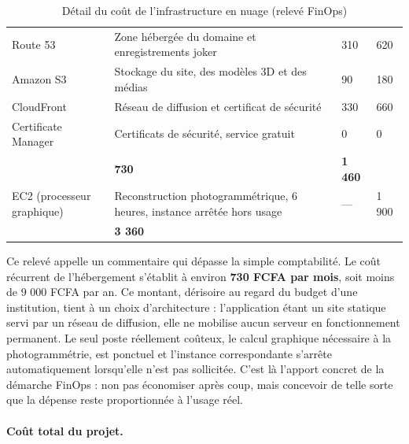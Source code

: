\begin{table}[htbp]
\centering
\caption{Détail du coût de l'infrastructure en nuage (relevé FinOps)}
\label{tab:finops}
\small
\begin{tabularx}{\textwidth}{|L{3.8cm}|X|R{2.2cm}|R{2.2cm}|}
\hline
{}
 &  &  &  \\ \hline
Route 53 & Zone hébergée du domaine et enregistrements joker & 310 & 620 \\ \hline
Amazon S3 & Stockage du site, des modèles 3D et des médias & 90 & 180 \\ \hline
CloudFront & Réseau de diffusion et certificat de sécurité & 330 & 660 \\ \hline
Certificate Manager & Certificats de sécurité, service gratuit & 0 & 0 \\ \hline
{}
 & \textbf{730} & \textbf{1 460} \\ \hline
EC2 (processeur graphique) & Reconstruction photogrammétrique, 6 heures, instance arrêtée hors usage & — & 1 900 \\ \hline
{}
 & \textbf{3 360} \\ \hline
\end{tabularx}
\end{table}

Ce relevé appelle un commentaire qui dépasse la simple comptabilité. Le coût
récurrent de l'hébergement s'établit à environ \textbf{730 FCFA par mois}, soit
moins de 9 000 FCFA par an. Ce montant, dérisoire au regard du budget d'une
institution, tient à un choix d'architecture : l'application étant un site
statique servi par un réseau de diffusion, elle ne mobilise aucun serveur en
fonctionnement permanent. Le seul poste réellement coûteux, le calcul graphique
nécessaire à la photogrammétrie, est ponctuel et l'instance correspondante
s'arrête automatiquement lorsqu'elle n'est pas sollicitée. C'est là l'apport
concret de la démarche FinOps : non pas économiser après coup, mais concevoir de
telle sorte que la dépense reste proportionnée à l'usage réel.

\paragraph{Coût total du projet.}

